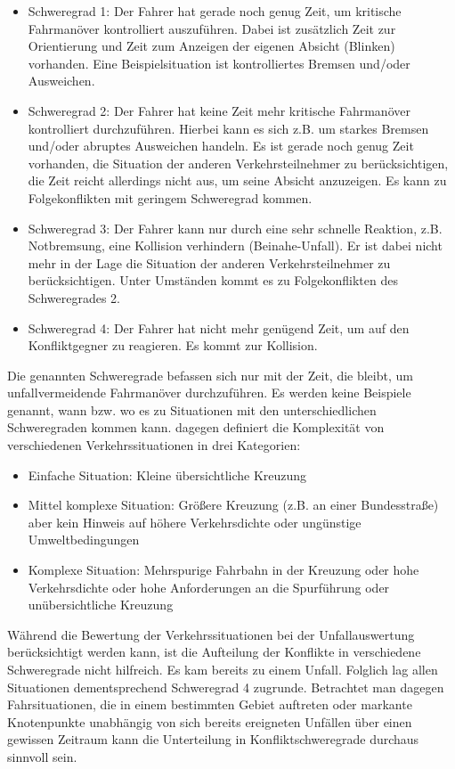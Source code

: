 \begin{itemize}
	\item Schweregrad 1: Der Fahrer hat gerade noch genug Zeit, um kritische Fahrmanöver kontrolliert auszuführen. Dabei ist zusätzlich Zeit zur Orientierung und Zeit zum Anzeigen der eigenen Absicht (Blinken) vorhanden. Eine Beispielsituation ist kontrolliertes Bremsen und/oder Ausweichen.
	\item Schweregrad 2: Der Fahrer hat keine Zeit mehr kritische Fahrmanöver kontrolliert durchzuführen. Hierbei kann es sich z.B. um starkes Bremsen und/oder abruptes Ausweichen handeln. Es ist gerade noch genug Zeit vorhanden, die Situation der anderen Verkehrsteilnehmer zu berücksichtigen, die Zeit reicht allerdings nicht aus, um seine Absicht anzuzeigen. Es kann zu Folgekonflikten mit geringem Schweregrad kommen.
	\item Schweregrad 3: Der Fahrer kann nur durch eine sehr schnelle Reaktion, z.B. Notbremsung, eine Kollision verhindern (Beinahe-Unfall). Er ist dabei nicht mehr in der Lage die Situation der anderen Verkehrsteilnehmer zu berücksichtigen. Unter Umständen kommt es zu Folgekonflikten des Schweregrades 2.
	\item Schweregrad 4: Der Fahrer hat nicht mehr genügend Zeit, um auf den Konfliktgegner zu reagieren. Es kommt zur Kollision.
\end{itemize}

Die genannten Schweregrade befassen sich nur mit der Zeit, die bleibt, um unfallvermeidende Fahrmanöver durchzuführen. Es werden keine Beispiele genannt, wann bzw. wo es zu Situationen mit den unterschiedlichen Schweregraden kommen kann. \Textcite[S. 33f]{Meitinger.2008} dagegen definiert die Komplexität von verschiedenen Verkehrssituationen in drei Kategorien:

\begin{itemize}
	\item Einfache Situation: Kleine übersichtliche Kreuzung	
	\item Mittel komplexe Situation: Größere Kreuzung (z.B. an einer Bundesstraße) aber kein Hinweis auf höhere Verkehrsdichte oder ungünstige Umweltbedingungen
	\item Komplexe Situation: Mehrspurige Fahrbahn in der Kreuzung oder hohe Verkehrsdichte oder hohe Anforderungen an die Spurführung oder unübersichtliche Kreuzung
\end{itemize}

Während die Bewertung der Verkehrssituationen bei der Unfallauswertung berücksichtigt werden kann, ist die Aufteilung der Konflikte in verschiedene Schweregrade nicht hilfreich. Es kam bereits zu einem Unfall. Folglich lag allen Situationen dementsprechend Schweregrad 4 zugrunde. Betrachtet man dagegen Fahrsituationen, die in einem bestimmten Gebiet auftreten oder markante Knotenpunkte unabhängig von sich bereits ereigneten Unfällen über einen gewissen Zeitraum kann die Unterteilung in Konfliktschweregrade durchaus sinnvoll sein.


